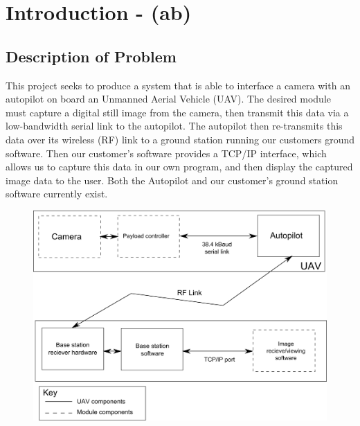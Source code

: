 
\chapter{Introduction - (ab)}

\section{Description of Problem}

This project seeks to produce a system that is able to interface a camera with an autopilot on board an Unmanned Aerial Vehicle (UAV). The desired module must capture a digital still image from the camera, then transmit this data via a low-bandwidth serial link to the autopilot. The autopilot then re-transmits this data over its wireless (RF) link to a ground station running our customers ground software. Then our customer's software provides a TCP/IP interface, which allows us to capture this data in our own program, and then display the captured image data to the user. Both the Autopilot and our customer's ground station software currently exist.

\begin{figure}[H]
        \centering
        \includegraphics[width=1.00\textwidth]{figures/spec_block_diagram_2.png}
        \label{fig:blockDiagram}
\end{figure}

